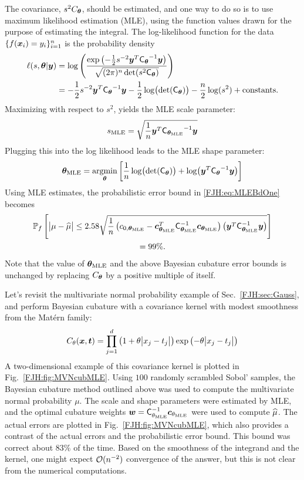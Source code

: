 \documentclass[graybox,footinfo]{svmult}
\begin{document}
The covariance, $s^2 C_{{\boldsymbol{\theta}}}$, should be estimated, and one way to do so is to use 
maximum likelihood estimation (MLE), using the function values drawn for the purpose of 
estimating the integral.  The log-likelihood function for the data $ \{f({\boldsymbol{x}}_i )= 
y_i\}_{i=1}^n$ is the probability density
\begin{align*}
\ell(s,{\boldsymbol{\theta}} | {\boldsymbol{y}}) & = \log \left(\frac{\exp\left(- \frac 12 s^{-2} {\boldsymbol{y}}^T 
\mathsf{C_{{\boldsymbol{\theta}}}}^{-1} {\boldsymbol{y}}\right)}{\sqrt{(2\pi)^n  \det(s^2 
\mathsf{C_{{\boldsymbol{\theta}}}})}}\right)\\
& = - \frac 12 s^{-2} {\boldsymbol{y}}^T \mathsf{C_{{\boldsymbol{\theta}}}}^{-1} {\boldsymbol{y}} -\frac 12  
\log \bigl(
\det(\mathsf{C_{{\boldsymbol{\theta}}}}) \bigr) - \frac n2 \log(s^2) + \text{constants}.
\end{align*}
Maximizing with respect to $s^2$, yields the MLE scale parameter:
\[
s_{\text{MLE}} =  \sqrt{\frac 1n {\boldsymbol{y}}^T \mathsf{C_{{\boldsymbol{\theta}}_{\text{MLE}}}}^{-1} {\boldsymbol{y}}}
\]
Plugging this into the log likelihood leads to the MLE shape parameter: 
\[
{\boldsymbol{\theta}}_{\text{MLE}} =  \operatorname*{argmin}_{\boldsymbol{\theta}} \left[\frac 1n \log \bigl(\det(\mathsf{C_{{\boldsymbol{\theta}}}}) 
\bigr) 
+ \log\bigl({\boldsymbol{y}}^T \mathsf{C_{{\boldsymbol{\theta}}}}^{-1} {\boldsymbol{y}} \bigr)  \right ]
\]
Using MLE estimates, the probabilistic error 
bound in \eqref{FJH:eq:MLEBdOne} becomes
\begin{multline} \label{FJH:eq:MLEBdTwo}
\Prob_f\left[\abs{\mu - \hmu} \le 2.58 
\sqrt{\frac 1n \left(c_{0,\bstheta_\MLE} - \bsc_{\bstheta_\MLE} ^T 
	\mC_{\bstheta_\MLE}^{-1} \bsc_{\bstheta_\MLE} \right)  \left(\bsy^T 
	\mathsf{C}_{\bstheta_\MLE}^{-1} \bsy\right)}\right] \\
 = 99\%.
\end{multline}
Note that the value of ${\boldsymbol{\theta}}_{\text{MLE}}$ and the above Bayesian cubature error bounds  
is unchanged by replacing  $C_{\boldsymbol{\theta}}$ by a positive multiple of itself.  

Let's revisit the multivariate normal probability example of Sec.\ \ref{FJH:sec:Gauss}, 
and perform Bayesian cubature with a covariance kernel with modest smoothness from 
the Mat\'ern  family:
\begin{equation} \label{FJH:eq:Matern}
C_\theta(\bsx,\bst) = \prod_{j=1}^d \left(1 + 
\theta\abs{x_j-t_j}\right) \exp\left(-\theta\abs{x_j-t_j}\right)
\end{equation}
A two-dimensional example of this covariance kernel is plotted in Fig.\ 
\ref{FJH:fig:MVNcubMLE}.  Using $100$ randomly scrambled Sobol' samples, the 
Bayesian 
cubature method outlined above was used to compute the multivariate normal probability 
$\mu$.  The scale and shape parameters were estimated by MLE, and the optimal 
cubature weights ${\boldsymbol{w}} = 
\mathsf{C}_{\theta_{\text{MLE}}}^{-1} {\boldsymbol{c}}_{\theta_{\text{MLE}}}$ were used to compute $\widehat{\mu}$.  
The actual errors are plotted in Fig.\ \ref{FJH:fig:MVNcubMLE}, which also provides a 
contrast of the actual errors and the probabilistic error bound.  This bound was correct 
about $83\%$ of the time.  Based on the smoothness of the integrand and the kernel, 
one might expect $\mathcal{O}(n^{-2})$ convergence of the answer, but this is not clear from 
the numerical computations.
\end{document}
